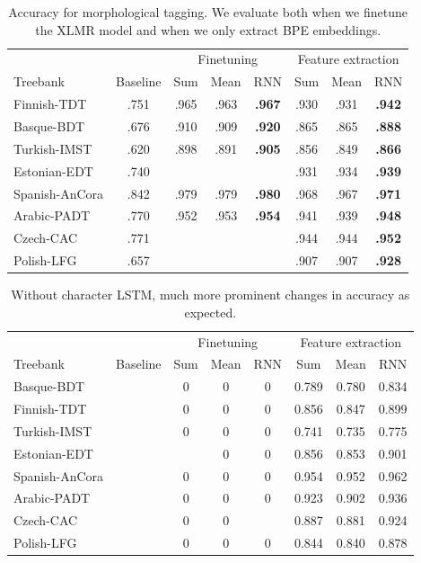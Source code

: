 \documentclass[11pt]{article}
\begin{document}
	\begin{table}[h]
	\centering
	\begin{tabular}{l|c|ccc|ccc}
		& & \multicolumn{3}{c}{Finetuning} & \multicolumn{3}{c}{Feature extraction} \\
		Treebank & Baseline & Sum & Mean & RNN & Sum & Mean & RNN \\
		\hline
		Finnish-TDT & .751 & .965 & .963 & \textbf{.967} & .930 & .931 & \textbf{.942} \\ 
		Basque-BDT & .676 & .910 & .909 & \textbf{.920} & .865 & .865 & \textbf{.888} \\
		Turkish-IMST & .620 & .898 & .891 & \textbf{.905} & .856 & .849 & \textbf{.866}\\
		Estonian-EDT & .740 & & & & .931 & .934 & \textbf{.939} \\
		Spanish-AnCora & .842 & .979 & .979 & \textbf{.980} & .968 & .967 & \textbf{.971} \\
		Arabic-PADT & .770 & .952 & .953&\textbf{.954} & .941 & .939 & \textbf{.948} \\
		Czech-CAC & .771 &  &  &  & .944 & .944 & \textbf{.952} \\
		Polish-LFG & .657 & & &  & .907 & .907 & \textbf{.928} \\
	\end{tabular}
	\caption{\label{tab:results_tokens} Accuracy for morphological tagging. We evaluate both when we finetune the XLMR model and when we only extract BPE embeddings.}
	\end{table}

	\begin{table}[h]
	\centering
	\begin{tabular}{l|c|ccc|ccc}
		& & \multicolumn{3}{c}{Finetuning} & \multicolumn{3}{c}{Feature extraction} \\
		Treebank & Baseline & Sum & Mean & RNN & Sum & Mean & RNN \\
		\hline
		Basque-BDT  &   & 0 & 0 & 0 & 0.789 & 0.780 & 0.834 \\
		Finnish-TDT  &  & 0 & 0 & 0 & 0.856 & 0.847 & 0.899 \\
		Turkish-IMST  &   & 0 & 0 & 0& 0.741 & 0.735 & 0.775 \\
		Estonian-EDT  &   & & 0 & 0 & 0.856 & 0.853 & 0.901 \\
		Spanish-AnCora  &  & 0 & 0 & 0 & 0.954 & 0.952 & 0.962 \\
		Arabic-PADT  & & 0 & 0 & 0  & 0.923 & 0.902 & 0.936 \\
		Czech-CAC  &  & 0 & 0 &  & 0.887 & 0.881 & 0.924 \\
		Polish-LFG  & & 0 & 0 & 0  & 0.844 & 0.840 & 0.878 \\
		
	\end{tabular}
	\caption{\label{tab:results_tokens_nochars} Without character LSTM, much more prominent changes in accuracy as expected.}
\end{table}
\end{document}
